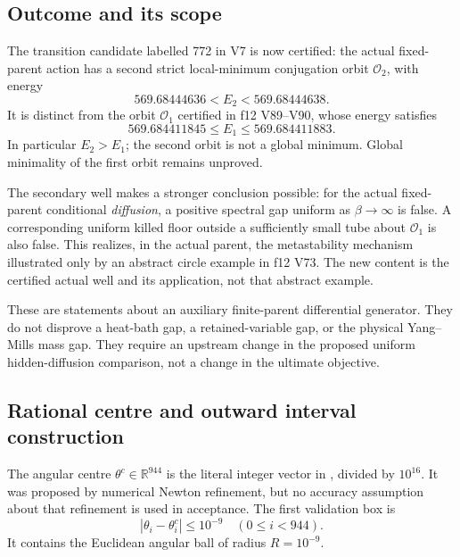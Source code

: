 \documentclass[11pt,oneside]{article}
\begin{document}
\subsection{Outcome and its scope}

The transition candidate labelled 772 in V7 is now
certified: the actual fixed-parent action has a
second strict local-minimum conjugation orbit
\(\mathcal O_2\), with energy
\[
 569.68444636<E_2<569.68444638 .
\]
It is distinct from the orbit \(\mathcal O_1\)
certified in f12 V89--V90, whose energy satisfies
\[
 569.684411845\le E_1\le569.684411883 .
\]
In particular \(E_2>E_1\); the second orbit is
not a global minimum. Global minimality of the
first orbit remains unproved.

The secondary well makes a stronger conclusion
possible: for the actual fixed-parent conditional
\emph{diffusion}, a positive spectral gap uniform
as \(\beta\to\infty\) is false. A corresponding
uniform killed floor outside a sufficiently
small tube about \(\mathcal O_1\) is also false.
This realizes, in the actual parent, the
metastability mechanism illustrated only by an
abstract circle example in f12 V73. The new
content is the certified actual well and its
application, not that abstract example.

These are statements about an auxiliary
finite-parent differential generator. They do
not disprove a heat-bath gap, a retained-variable
gap, or the physical Yang--Mills mass gap.
They require an upstream change in the proposed
uniform hidden-diffusion comparison, not a change
in the ultimate objective.

\subsection{Rational centre and outward interval construction}

The angular centre \(\theta^c\in\mathbb R^{944}\)
is the literal integer vector in
, divided
by \(10^{16}\). It was proposed by numerical
Newton refinement, but no accuracy assumption
about that refinement is used in acceptance.
The first validation box is
\[
 |\theta_i-\theta_i^c|\le10^{-9}\quad(0\le i<944).
\]
It contains the Euclidean angular ball of
radius \(R=10^{-9}\).
\end{document}
